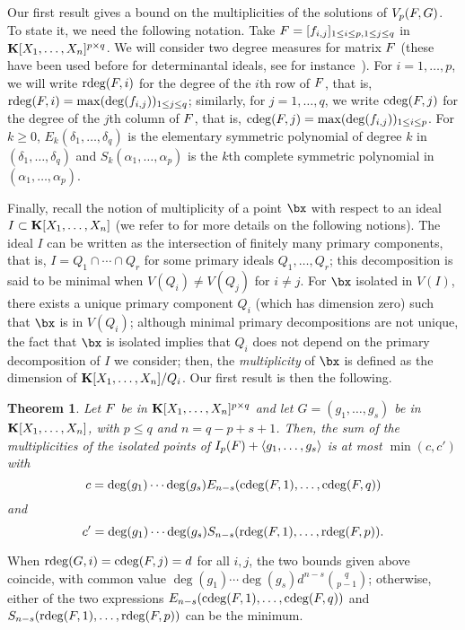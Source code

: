 \documentclass[12pt]{article}
\newtheorem{theorem}[definition]{Theorem}
\begin{document}
Our first result gives a bound on the multiplicities of the solutions
of $V_{p}({F},G)$. To state it, we need the following notation.
Take ${F}=[f_{i,j}]_{1 \le i \le p, 1 \le j \le q}$ in
$\mathbf{K}[X_1,\dots,X_n]^{p \times q}$.  We will consider two degree
measures for matrix ${F}$ (these have been used before for
determinantal ideals, see for instance~\cite{NieRan09,MiSt04}). For
$i=1,\dots,p$, we will write $\mathrm{rdeg}({F},i)$ for the degree of the
$i$th row of ${F}$, that is, $\mathrm{rdeg}({F},i)=\max(\deg(f_{i,j}))_{1 \le
  j \le q}$; similarly, for $j=1,\dots,q$, we write $\mathrm{cdeg}({F},j)$ for
the degree of the $j$th column of ${F}$, that is,
$\mathrm{cdeg}({F},j)=\max(\deg(f_{i,j}))_{1 \le i \le p}$. For $k \ge 0$,
$E_k(\delta_1,\dots,\delta_q)$ is the elementary symmetric polynomial
of degree $k$ in $(\delta_1, \ldots, \delta_q)$ and
$S_k(\alpha_1,\dots,\alpha_p)$ is the $k$th complete symmetric
polynomial in $(\alpha_1,\dots,\alpha_p)$.

Finally, recall the notion of multiplicity of a point $\bx$ with
respect to an ideal $I \subset\mathbf{K}[X_1,\dots,X_n]$ (we refer to
\cite{Eisenbud95} for more details on the following notions).  The
ideal $I$ can be written as the intersection of finitely many primary
components, that is, $I=Q_1\cap\cdots \cap Q_r$ for some primary
ideals $Q_1,\dots,Q_r$; this decomposition is said to be minimal when
$V(Q_i)\neq V(Q_j)$ for $i\neq j$. For $\bx$  isolated in $V(I)$, there
exists a unique primary component $Q_i$ (which has dimension zero)
such that $\bx$ is in $V(Q_i)$; although minimal primary decompositions
are not unique, the fact that $\bx$ is isolated implies that $Q_i$
does not depend on the primary decomposition of $I$ we consider; then,
the \emph{multiplicity} of $\bx$ is defined as the dimension of
$\mathbf{K}[X_1,\dots,X_n]/Q_i$. Our first result is then the following.

\begin{theorem}\label{theo:1}
  Let ${F}$ be in $\mathbf{K}[X_1,\dots,X_n]^{p \times q}$ and let
  $G=(g_1,\dots,g_s)$ be in $\mathbf{K}[X_1,\dots,X_n]$, with $p \le q$ and
  $n=q-p+s+1$. Then, the sum of the multiplicities of the isolated
  points of $I_p({F}) + \langle g_1,\dots,g_s \rangle$ is at most
  $\min(c,c')$ with
$$c=\deg(g_1) \cdots \deg(g_s) E_{n-s}(\mathrm{cdeg}({F},1), \ldots, \mathrm{cdeg}({F},q))$$
and
$$c'=\deg(g_1) \cdots \deg(g_s) S_{n-s}(\mathrm{rdeg}({F},1), \ldots, \mathrm{rdeg}({F},p)).$$
\end{theorem}
When $\mathrm{rdeg}({G},i)=\mathrm{cdeg}({F},j)=d$ for all $i,j$, the two bounds given
above coincide, with common value $\deg(g_1) \cdots \deg(g_s) d^{n-s}
{q \choose {p-1}}$; otherwise, either of the two expressions
$E_{n-s}(\mathrm{cdeg}({F},1), \ldots, \mathrm{cdeg}({F},q))$ and
$S_{n-s}(\mathrm{rdeg}({F},1), \ldots, \mathrm{rdeg}({F},p))$ can be the
minimum.
\end{document}
